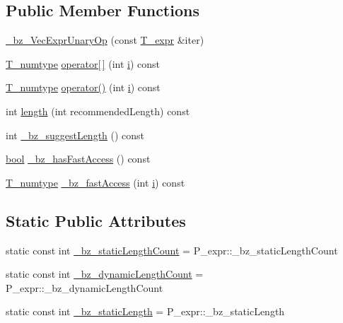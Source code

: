 \subsection*{Public Member Functions}
\begin{DoxyCompactItemize}
\item 
\hyperlink{class__bz__VecExprUnaryOp_a32a5481bdbec42c29b2923f2f8af5e84}{\+\_\+bz\+\_\+\+Vec\+Expr\+Unary\+Op} (const \hyperlink{class__bz__VecExprUnaryOp_a548e39ca3d7cd9ac4613ca52d665aeb2}{T\+\_\+expr} \&iter)
\item 
\hyperlink{class__bz__VecExprUnaryOp_acb8a38cc50c0d7ceb35a1f81e5ff9e8c}{T\+\_\+numtype} \hyperlink{class__bz__VecExprUnaryOp_a61dd39949d8650078d112962e2a58891}{operator\mbox{[}$\,$\mbox{]}} (int \hyperlink{indexexpr_8h_aabd77643995707c185e95c8cb2782c81}{i}) const 
\item 
\hyperlink{class__bz__VecExprUnaryOp_acb8a38cc50c0d7ceb35a1f81e5ff9e8c}{T\+\_\+numtype} \hyperlink{class__bz__VecExprUnaryOp_a13259ea7a278974da3c4f70c87ee7878}{operator()} (int \hyperlink{indexexpr_8h_aabd77643995707c185e95c8cb2782c81}{i}) const 
\item 
int \hyperlink{class__bz__VecExprUnaryOp_a1e352044616e4d3b508178913a379f51}{length} (int recommended\+Length) const 
\item 
int \hyperlink{class__bz__VecExprUnaryOp_abf6b7cb8ec0302f1a74e77f7a02eba16}{\+\_\+bz\+\_\+suggest\+Length} () const 
\item 
\hyperlink{compiler_8h_abb452686968e48b67397da5f97445f5b}{bool} \hyperlink{class__bz__VecExprUnaryOp_a28cef17b4fe5bb02e1300488c2632621}{\+\_\+bz\+\_\+has\+Fast\+Access} () const 
\item 
\hyperlink{class__bz__VecExprUnaryOp_acb8a38cc50c0d7ceb35a1f81e5ff9e8c}{T\+\_\+numtype} \hyperlink{class__bz__VecExprUnaryOp_a6d07993b78ee200cbed66aee11d5b9c5}{\+\_\+bz\+\_\+fast\+Access} (int \hyperlink{indexexpr_8h_aabd77643995707c185e95c8cb2782c81}{i}) const 
\end{DoxyCompactItemize}
\subsection*{Static Public Attributes}
\begin{DoxyCompactItemize}
\item 
static const int \hyperlink{class__bz__VecExprUnaryOp_ab22a792405b83f0a71c9e95a90e2e2cd}{\+\_\+bz\+\_\+static\+Length\+Count} = P\+\_\+expr\+::\+\_\+bz\+\_\+static\+Length\+Count
\item 
static const int \hyperlink{class__bz__VecExprUnaryOp_a4061a2047b3d8afef55df488450beed2}{\+\_\+bz\+\_\+dynamic\+Length\+Count} = P\+\_\+expr\+::\+\_\+bz\+\_\+dynamic\+Length\+Count
\item 
static const int \hyperlink{class__bz__VecExprUnaryOp_a58cefc7c2d9a2d902df53a3842366999}{\+\_\+bz\+\_\+static\+Length} = P\+\_\+expr\+::\+\_\+bz\+\_\+static\+Length
\end{DoxyCompactItemize}


